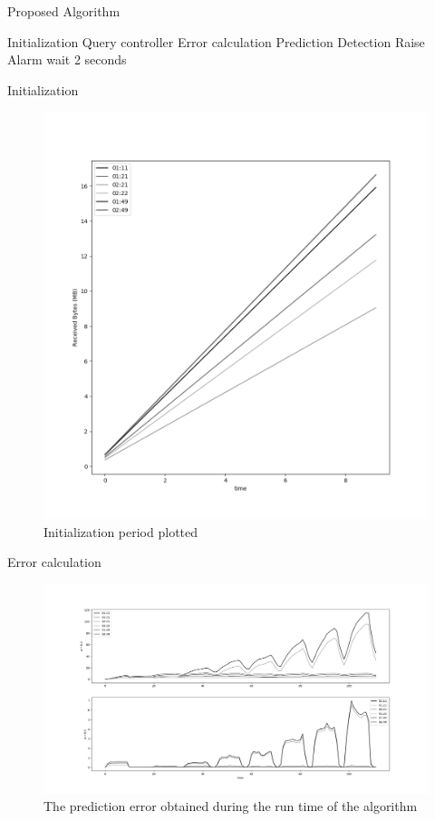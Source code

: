\documentclass{beamer}
\begin{document}
\begin{frame}{Proposed Algorithm}
    \begin{algorithm}[H]
        \caption{Elephant Detection Algorithm - High Level} \label{alg:high_level}
        \begin{algorithmic}[1]
                \State Initialization
                \Loop
                    \State Query controller
                    \State Error calculation
                    \State Prediction
                    \State Detection
                        \State Raise Alarm
                    \EndIf
                    \State wait 2 seconds
                \EndLoop
            \EndProcedure 
           \end{algorithmic}
    \end{algorithm}
\end{frame}

\begin{frame}{Initialization}
    \begin{figure}
        \includegraphics[width=.5\textwidth]{meter_eleph/init_period_lin}
        \caption{Initialization period plotted}
    \end{figure}
\end{frame}

\begin{frame}{Error calculation}
    \begin{figure}
        \includegraphics[width=1\textwidth]{meter_eleph/error_plot_sse}
        \caption{The prediction error obtained during the run time of the algorithm}
    \end{figure}
\end{frame}
\end{document}
